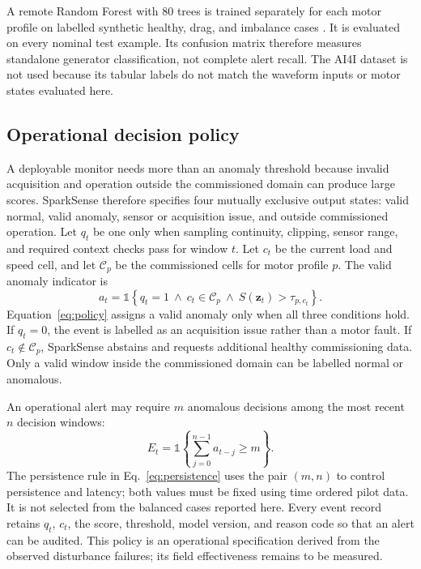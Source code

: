\documentclass[10pt,twocolumn]{article}
\newcommand{\vect}[1]{\boldsymbol{#1}}
\begin{document}
A remote Random Forest with 80 trees is trained separately for each motor profile on labelled synthetic healthy, drag, and imbalance cases \cite{breiman2001}. It is evaluated on every nominal test example. Its confusion matrix therefore measures standalone generator classification, not complete alert recall. The AI4I dataset is not used because its tabular labels do not match the waveform inputs or motor states evaluated here.

\subsection{Operational decision policy}
A deployable monitor needs more than an anomaly threshold because invalid acquisition and operation outside the commissioned domain can produce large scores. SparkSense therefore specifies four mutually exclusive output states: valid normal, valid anomaly, sensor or acquisition issue, and outside commissioned operation. Let $q_t$ be one only when sampling continuity, clipping, sensor range, and required context checks pass for window $t$. Let $c_t$ be the current load and speed cell, and let $\mathcal{C}_p$ be the commissioned cells for motor profile $p$. The valid anomaly indicator is
\begin{equation}
a_t=\mathbb{1}\!\left\{q_t=1\ \land\ c_t\in\mathcal{C}_p\ \land\ S(\vect{z}_t)>\tau_{p,c_t}\right\}.
\label{eq:policy}
\end{equation}
Equation~\eqref{eq:policy} assigns a valid anomaly only when all three conditions hold. If $q_t=0$, the event is labelled as an acquisition issue rather than a motor fault. If $c_t\notin\mathcal{C}_p$, SparkSense abstains and requests additional healthy commissioning data. Only a valid window inside the commissioned domain can be labelled normal or anomalous.

An operational alert may require $m$ anomalous decisions among the most recent $n$ decision windows:
\begin{equation}
E_t=\mathbb{1}\!\left\{\sum_{j=0}^{n-1}a_{t-j}\ge m\right\}.
\label{eq:persistence}
\end{equation}
The persistence rule in Eq.~\eqref{eq:persistence} uses the pair $(m,n)$ to control persistence and latency; both values must be fixed using time ordered pilot data. It is not selected from the balanced cases reported here. Every event record retains $q_t$, $c_t$, the score, threshold, model version, and reason code so that an alert can be audited. This policy is an operational specification derived from the observed disturbance failures; its field effectiveness remains to be measured.
\end{document}
